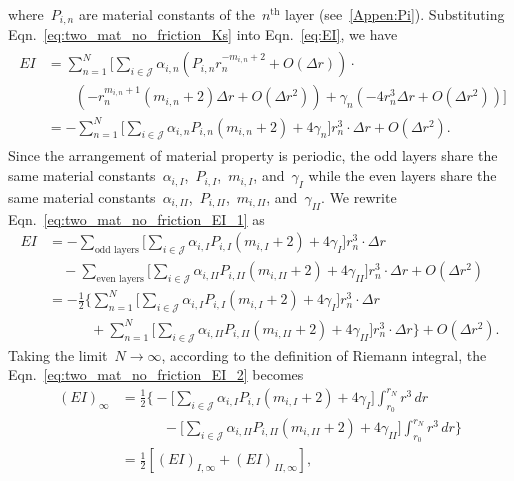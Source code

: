\documentclass[preprint,10pt,times]{elsarticle}
\numberwithin{equation}{section}
\renewcommand{\>}{$\Rightarrow$}
\begin{document}
where~$P_{i,n}$ are material constants of the~$n^{\text{th}}$ layer (see~\ref{Appen:Pi}).  Substituting Eqn.~\eqref{eq:two_mat_no_friction_Ks} into Eqn.~\eqref{eq:EI}, we have
\begin{equation}
	\begin{aligned}
	\begin{split}
	EI & = \sum_{n=1}^{N} \bigg[ \sum_{i \in \mathcal{J}} \alpha_{i,n} \left( P_{i,n} r_n^{-m_{i,n} + 2} + O(\Delta r) \right) \cdot \\ & \qquad{} (- r_{n}^{m_{i,n}+1}(m_{i,n} + 2 ) \Delta r + O(\Delta r^2))  + \gamma_n (-4 r_n^3 \Delta r + O(\Delta r^2)) \bigg] \\
	 & = -\sum_{n=1}^{N} \bigg[ \sum_{i \in \mathcal{J}} \alpha_{i,n} P_{i,n} (m_{i,n} + 2) + 4\gamma_n \bigg] r_{n}^3 \cdot \Delta r + O(\Delta r^2).
	\end{split}
	\end{aligned}
	\label{eq:two_mat_no_friction_EI_1}
\end{equation}
Since the arrangement of material property is periodic, the odd layers share the same material constants~$\alpha_{i,I}$,~$P_{i,I}$,~$m_{i,I}$, and~$\gamma_{I}$ while the even layers share the same material constants~$\alpha_{i,II}$,~$P_{i,II}$,~$m_{i,II}$, and~$\gamma_{II}$. We rewrite Eqn.~\eqref{eq:two_mat_no_friction_EI_1} as
\begin{equation}
	\begin{aligned}
		EI & = -\sum_{\text{odd layers}} \bigg[ \sum_{i \in \mathcal{J}} \alpha_{i,I} P_{i,I} (m_{i,I} + 2) + 4\gamma_{I} \bigg] r_{n}^3 \cdot \Delta r \\ & \quad{} -\sum_{\text{even layers}} \bigg[ \sum_{i \in \mathcal{J}} \alpha_{i,II} P_{i,II} (m_{i,II} + 2) + 4\gamma_{II} \bigg] r_{n}^3 \cdot \Delta r + O(\Delta r^2) \\
		 & = -\frac{1}{2}
		 \bigg\lbrace
		 \sum_{n=1}^N \bigg[ \sum_{i \in \mathcal{J}} \alpha_{i,I} P_{i,I} (m_{i,I} + 2) + 4\gamma_{I} \bigg] r_{n}^3 \cdot \Delta r \\ & \quad\qquad{} + \sum_{n=1}^N \bigg[ \sum_{i \in \mathcal{J}} \alpha_{i,II} P_{i,II} (m_{i,II} + 2) + 4\gamma_{II} \bigg] r_{n}^3 \cdot \Delta r
		 \bigg\rbrace + O(\Delta r^2).
	\end{aligned}
	\label{eq:two_mat_no_friction_EI_2}
\end{equation}
Taking the limit~$N \to \infty$, according to the definition of Riemann integral, the Eqn.~\eqref{eq:two_mat_no_friction_EI_2} becomes
\begin{equation}
	 \begin{aligned}
	   (EI)_{\infty} & = \frac{1}{2}  \Biggl \{
	   		- \Biggl[ \sum_{i \in \mathcal{J}} \alpha_{i,I} P_{i,I} (m_{i,I} + 2) + 4\gamma_{I} \Biggr]
			\int_{r_0}^{r_N} r^3 \, dr \\ & \quad\qquad{}
			- \Biggl[ \sum_{i \in \mathcal{J}} \alpha_{i,II} P_{i,II} (m_{i,II} + 2) + 4\gamma_{II} \Biggr]
			\int_{r_0}^{r_N} r^3 \, dr
	    \Biggl \} \\
	    & = \frac{1}{2} \left[ (EI)_{I,\infty} + (EI)_{II,\infty} \right],
	 \end{aligned}
	\label{eq:two_mat_no_friction_EI}
\end{equation}
\end{document}

